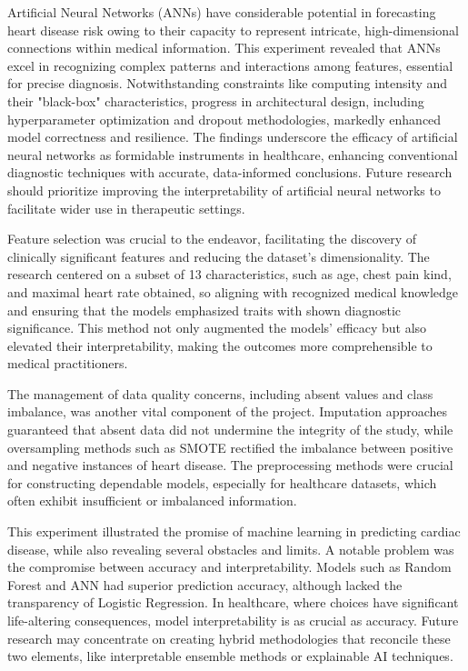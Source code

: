 Artificial Neural Networks (ANNs) have considerable potential in forecasting heart disease risk owing to their capacity to represent intricate, high-dimensional connections within medical information. This experiment revealed that ANNs excel in recognizing complex patterns and interactions among features, essential for precise diagnosis. Notwithstanding constraints like computing intensity and their "black-box" characteristics, progress in architectural design, including hyperparameter optimization and dropout methodologies, markedly enhanced model correctness and resilience. The findings underscore the efficacy of artificial neural networks as formidable instruments in healthcare, enhancing conventional diagnostic techniques with accurate, data-informed conclusions. Future research should prioritize improving the interpretability of artificial neural networks to facilitate wider use in therapeutic settings.

Feature selection was crucial to the endeavor, facilitating the discovery of clinically significant features and reducing the dataset's dimensionality. The research centered on a subset of 13 characteristics, such as age, chest pain kind, and maximal heart rate obtained, so aligning with recognized medical knowledge and ensuring that the models emphasized traits with shown diagnostic significance. This method not only augmented the models' efficacy but also elevated their interpretability, making the outcomes more comprehensible to medical practitioners.

The management of data quality concerns, including absent values and class imbalance, was another vital component of the project. Imputation approaches guaranteed that absent data did not undermine the integrity of the study, while oversampling methods such as SMOTE rectified the imbalance between positive and negative instances of heart disease. The preprocessing methods were crucial for constructing dependable models, especially for healthcare datasets, which often exhibit insufficient or imbalanced information.

This experiment illustrated the promise of machine learning in predicting cardiac disease, while also revealing several obstacles and limits. A notable problem was the compromise between accuracy and interpretability. Models such as Random Forest and ANN had superior prediction accuracy, although lacked the transparency of Logistic Regression. In healthcare, where choices have significant life-altering consequences, model interpretability is as crucial as accuracy. Future research may concentrate on creating hybrid methodologies that reconcile these two elements, like interpretable ensemble methods or explainable AI techniques.


